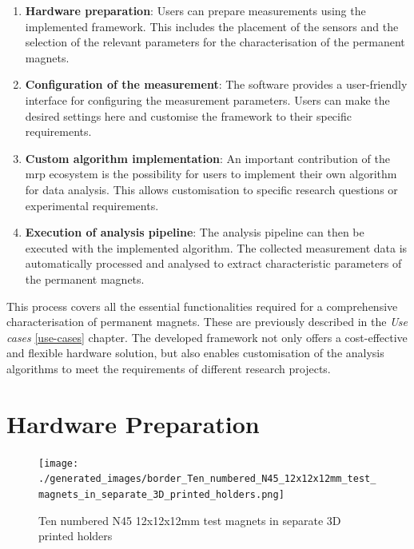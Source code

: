 \begin{enumerate}
\def\labelenumi{\arabic{enumi}.}
\item
  \textbf{Hardware preparation}: Users can prepare measurements using
  the implemented framework. This includes the placement of the sensors
  and the selection of the relevant parameters for the characterisation
  of the permanent magnets.
\item
  \textbf{Configuration of the measurement}: The software provides a
  user-friendly interface for configuring the measurement parameters.
  Users can make the desired settings here and customise the framework
  to their specific requirements.
\item
  \textbf{Custom algorithm implementation}: An important contribution of
  the \gls{mrp} ecosystem is the possibility for users to implement
  their own algorithm for data analysis. This allows customisation to
  specific research questions or experimental requirements.
\item
  \textbf{Execution of analysis pipeline}: The analysis pipeline can
  then be executed with the implemented algorithm. The collected
  measurement data is automatically processed and analysed to extract
  characteristic parameters of the permanent magnets.
\end{enumerate}

\newpage

This process covers all the essential functionalities required for a
comprehensive characterisation of permanent magnets. These are
previously described in the \emph{Use cases} \ref{use-cases} chapter.
The developed framework not only offers a cost-effective and flexible
hardware solution, but also enables customisation of the analysis
algorithms to meet the requirements of different research projects.

\hypertarget{hardware-preparation}{%
\section{Hardware Preparation}\label{hardware-preparation}}

\begin{figure}
\centering
\texttt{[image: ./generated\_images/border\_Ten\_numbered\_N45\_12x12x12mm\_test\_magnets\_in\_separate\_3D\_printed\_holders.png]}
\caption{Ten numbered N45 12x12x12mm test magnets in separate 3D printed
holders
\label{Ten_numbered_N45_12x12x12mm_test_magnets_in_separate_3D_printed_holders.png}}
\end{figure}

